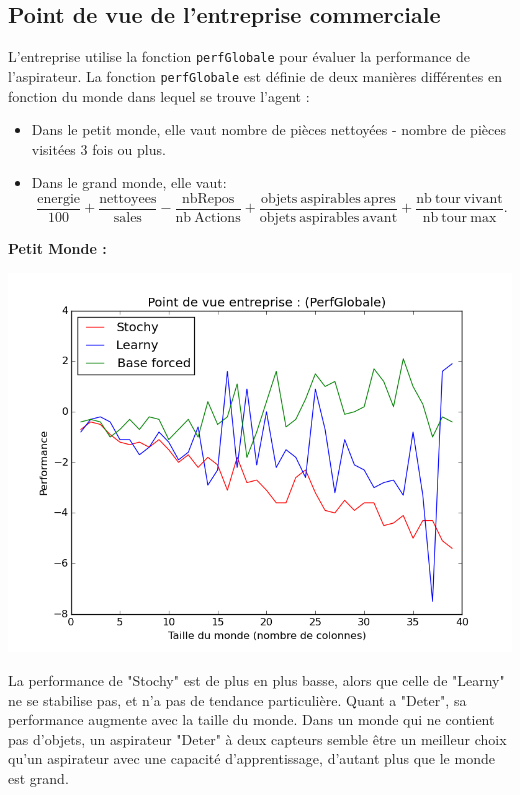 \documentclass[12pt]{article}
\begin{document}
\subsection{Point de vue de l'entreprise commerciale}
L'entreprise utilise la fonction \texttt{perfGlobale} pour évaluer la performance de l'aspirateur. La fonction \texttt{perfGlobale} est définie de deux manières différentes en fonction du monde dans lequel se trouve l'agent : 
\begin{itemize}
\item Dans le petit monde, elle vaut nombre de pièces nettoyées - nombre de pièces visitées 3 fois ou plus.
\item Dans le grand monde, elle vaut: 
$$\frac{\mathrm{energie}}{100} + \frac{\mathrm{nettoyees}}{\mathrm{sales}} - \frac{\mathrm{nbRepos}}{\mathrm{nb \ Actions}}+\frac{\mathrm{objets \ aspirables \ apres}}{\mathrm{objets \ aspirables \ avant}} + \frac{\mathrm{nb \ tour \ vivant}}{\mathrm{nb \ tour \ max}}.$$
\end{itemize}  
\justify
\textbf{Petit Monde : }
\begin{center}
\includegraphics[scale=0.5]{perfglob_01}
\end{center}
\justify
La performance de "Stochy" est de plus en plus basse, alors que celle de "Learny" ne se stabilise pas, et n'a pas de tendance particulière. Quant a "Deter", sa performance augmente avec la taille du monde. Dans un monde qui ne contient pas d'objets, un aspirateur "Deter" à deux capteurs semble être un meilleur choix qu'un aspirateur avec une capacité d'apprentissage, d'autant plus que le monde est grand. 
\clearpage
\justify
\end{document}
